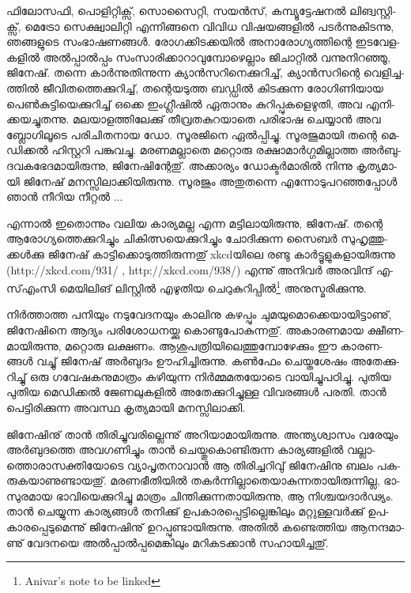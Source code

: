 ­ഫി­ലോ­സ­ഫി, പൊ­ളി­റ്റി­ക്സ്, സൊ­സൈ­റ്റി, സയന്‍­സ്, കമ്പ്യൂ­ട്ടേ­ഷ­നല്‍ ലി­ങ്വ­സ്റ്റി­ക്സ്, മെ­ട്രോ സെ­ക്ഷ്വാ­ലി­റ്റി എന്നി­ങ്ങ­നെ വി­വിധ 
വി­ഷ­യ­ങ്ങ­ളില്‍ പടര്‍­ന്നു­കി­ട­ന്നു, ഞങ്ങ­ളു­ടെ സം­ഭാ­ഷ­ണ­ങ്ങള്‍. രോ­ഗ­ക്കി­ട­ക്ക­യില്‍ അനാ­രോ­ഗ്യ­ത്തി­ന്റെ ഇട­വേ­ള­ക­ളില്‍ 
അല്‍­പ്പാല്‍­പ്പം സം­സാ­രി­ക്കാ­റാ­വു­മ്പോ­ഴെ­ല്ലാം ജി­ചാ­റ്റില്‍ വന്നു­നി­റ­ഞ്ഞൂ, ജി­നേ­ഷ്. തന്നെ കാര്‍­ന്നു­തി­ന്നു­ന്ന ക്യാന്‍­സ­റി­നെ­ക്കു­റി­ച്ച്, 
ക്യാന്‍­സ­റി­ന്റെ വെ­ളി­ച്ച­ത്തില്‍ ജീ­വി­ത­ത്തെ­ക്കു­റി­ച്ച്, തന്റെ­യ­ടു­ത്ത ബഡ്ഡില്‍ കി­ട­ക്കു­ന്ന രോ­ഗി­ണി­യായ പെണ്‍­കു­ട്ടി­യെ­ക്കു­റി­ച്ച് 
ഒക്കെ ഇം­ഗ്ലീ­ഷില്‍ ഏതാ­നും കു­റി­പ്പു­ക­ളെ­ഴു­തി, അവ എനി­ക്ക­യ­ച്ചു­ത­ന്നു. മല­യാ­ള­ത്തി­ലേ­ക്കു് തീ­വ്ര­ത­കു­റ­യാ­തെ പരി­ഭാഷ ചെ­യ്യാന്‍ 
അവ ബ്ലോ­ഗി­ലൂ­ടെ പരി­ചി­ത­നായ ഡോ. സൂ­ര­ജി­നെ ഏല്‍­പ്പി­ച്ചു. സൂ­ര­ജു­മാ­യി തന്റെ മെ­ഡി­ക്കല്‍ ഹി­സ്റ്റ­റി പങ്കു­വ­ച്ചു. മര­ണ­മ­ല്ലാ­തെ 
മറ്റൊ­രു രക്ഷാ­മാര്‍­ഗ്ഗ­മി­ല്ലാ­ത്ത അര്‍­ബു­ദ­വ­ക­ഭേ­ദ­മാ­യി­രു­ന്നു, ജി­നേ­ഷി­ന്റേ­തു്. അക്കാ­ര്യം ഡോ­ക്ടര്‍­മാ­രില്‍ നി­ന്നു കൃ­ത്യ­മാ­യി 
ജി­നേ­ഷ് മന­സ്സി­ലാ­ക്കി­യി­രു­ന്നു. സൂ­ര­ജും അതു­ത­ന്നെ എന്നോ­ടു­പ­റ­ഞ്ഞ­പ്പോള്‍ ഞാന്‍ നീ­റിയ നീ­റ്റല്‍ ...

എ­ന്നാല്‍ ഇതൊ­ന്നും വലിയ കാ­ര്യ­മ­ല്ല എന്ന മട്ടി­ലാ­യി­രു­ന്നു, ജി­നേ­ഷ്. തന്റെ ആരോ­ഗ്യ­ത്തെ­ക്കു­റി­ച്ചും ചി­കി­ത്സ­യെ­ക്കു­റി­ച്ചും 
ചോ­ദി­ക്കു­ന്ന സൈ­ബര്‍ സു­ഹൃ­ത്തു­ക്കള്‍­ക്കു ജി­നേ­ഷ് കാ­ട്ടി­ക്കൊ­ടു­ത്തി­രു­ന്ന­തു് xkcd­യി­ലെ രണ്ടു കാര്‍­ട്ടൂ­ളു­ക­ളാ­യി­രു­ന്നു 
(http://xkcd.com/931/  , http://xkcd.com/938/) എന്നു് അനി­വര്‍ അര­വി­ന്ദ് എ­സ്എം­സി­ മെ­യി­ലി­ങ് ലി­സ്റ്റില്‍ എഴു­തിയ 
ചെ­റു­കു­റി­പ്പില്‍\footnote{Anivar's note to be linked} അനു­സ്മ­രി­ക്കു­ന്നു­. 

നിര്‍­ത്താ­ത്ത പനി­യും നടു­വേ­ദ­ന­യും കാ­ലി­നു കഴ­പ്പും ചു­മ­യു­മൊ­ക്കെ­യാ­യി­ട്ടാ­ണു്, ജി­നേ­ഷി­നെ ആദ്യം പരി­ശോ­ധ­ന­യ്ക്കു 
കൊ­ണ്ടു­പോ­കു­ന്ന­തു്. അകാ­ര­ണ­മായ ക്ഷീ­ണ­മാ­യി­രു­ന്നു, മറ്റൊ­രു ലക്ഷ­ണം. ആശു­പ­ത്രി­യി­ലെ­ത്തു­മ്പോ­ഴേ­ക്കും ഈ 
കാ­ര­ണ­ങ്ങള്‍ വച്ചു് ജി­നേ­ഷ് അര്‍­ബു­ദം ഊഹി­ച്ചി­രു­ന്നു. കണ്‍­ഫേം ചെ­യ്ത­ശേ­ഷം അതേ­ക്കു­റി­ച്ചു് ഒരു ഗവേ­ഷ­ക­നു­മാ­ത്രം 
കഴി­യു­ന്ന നിര്‍­മ്മ­മ­ത­യോ­ടെ വാ­യി­ച്ചു­പ­ഠി­ച്ചു. പു­തിയ പു­തിയ മെ­ഡി­ക്കല്‍ ജേ­ണ­ലു­ക­ളില്‍ അതേ­ക്കു­റി­ച്ചു­ള്ള വി­വ­ര­ങ്ങള്‍ പര­തി. 
താന്‍ പെ­ട്ടി­രി­ക്കു­ന്ന അവ­സ്ഥ കൃ­ത്യ­മാ­യി മന­സ്സി­ലാ­ക്കി­.

­ജി­നേ­ഷി­നു് താന്‍ തി­രി­ച്ചു­വ­രി­ല്ലെ­ന്നു് അറി­യാ­മാ­യി­രു­ന്നു. അന്ത്യ­ശ്വാ­സം വരേ­യും അര്‍­ബു­ദ­ത്തെ അവ­ഗ­ണി­ച്ചും താന്‍ 
ചെ­യ്തു­കൊ­ണ്ടി­രു­ന്ന കാ­ര്യ­ങ്ങ­ളില്‍ വല്ലാ­ത്തൊ­രാ­സ­ക്തി­യോ­ടെ വ്യാ­പൃ­ത­നാ­വാന്‍ ആ തി­രി­ച്ച­റി­വു് ജി­നേ­ഷി­നു ബലം 
പക­രു­ക­യാ­ണു­ണ്ടാ­യ­തു്. മര­ണ­ഭീ­തി­യില്‍ തകര്‍­ന്നി­ല്ലാ­തെ­യാ­കു­ന്ന­താ­യി­രു­ന്നി­ല്ല, ഭാ­സു­ര­മായ ഭാ­വി­യെ­ക്കു­റി­ച്ചു മാ­ത്രം 
ചി­ന്തി­ക്കു­ന്ന­താ­യി­രു­ന്നു, ആ നി­ശ്ച­യ­ദാര്‍­ഢ്യം. താന്‍ ചെ­യ്യു­ന്ന കാ­ര്യ­ങ്ങള്‍ തനി­ക്കു് ഉപ­കാ­ര­പ്പെ­ട്ടി­ല്ലെ­ങ്കി­ലും മറ്റു­ള്ള­വര്‍­ക്കു് 
ഉപ­കാ­ര­പ്പെ­ടു­മെ­ന്നു് ജി­നേ­ഷി­നു് ഉറ­പ്പു­ണ്ടാ­യി­രു­ന്നു. അതില്‍ കണ്ടെ­ത്തിയ ആന­ന്ദ­മാ­ണു് വേ­ദ­ന­യെ അല്‍­പ്പാല്‍­പ്പ­മെ­ങ്കി­ലും 
മറി­ക­ട­ക്കാന്‍ സഹാ­യി­ച്ച­തു്.

